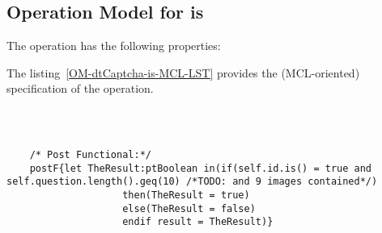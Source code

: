 \subsection{Operation Model for is}

\label{OM-is}


The  operation has the following properties:

	\begin{operationmodel}



		


	\end{operationmodel}



	\vspace{1cm}
	The listing~\ref{OM-dtCaptcha-is-MCL-LST} provides the \msrmessir (MCL-oriented) specification of the operation.
	
	\scriptsize
	\vspace{0.5cm}
	\begin{lstlisting}[style=MessirStyle,firstnumber=auto,captionpos=b,caption={\msrmessir (MCL-oriented) specification of the operation \emph{is}.},label=OM-dtCaptcha-is-MCL-LST]

	
	
	/* Post Functional:*/ 
	postF{let TheResult:ptBoolean in(if(self.id.is() = true and self.question.length().geq(10) /*TODO: and 9 images contained*/)
					then(TheResult = true)
					else(TheResult = false)
					endif result = TheResult)}
	
	
	\end{lstlisting}
	\normalsize 
	
	
	
	





